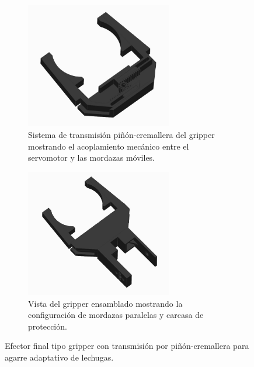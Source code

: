 \begin{figure}[H]
    \centering
    \begin{subfigure}{0.35\textwidth}
        \centering
        \includegraphics[width=0.7\textwidth]{img/gripper.jpg}
        \caption{Sistema de transmisión piñón-cremallera del gripper mostrando el acoplamiento mecánico entre el servomotor y las mordazas móviles.}
        \label{fig:gripper_Real_transmision}
    \end{subfigure}
    \hspace{0.5cm}
    \begin{subfigure}{0.35\textwidth}
        \centering
        \includegraphics[width=0.7\textwidth]{img/pinza_tapa.png}
        \caption{Vista del gripper ensamblado mostrando la configuración de mordazas paralelas y carcasa de protección.}
        \label{fig:gripper_Real}
    \end{subfigure}
    \caption{Efector final tipo gripper con transmisión por piñón-cremallera para agarre adaptativo de lechugas.}
\end{figure}

